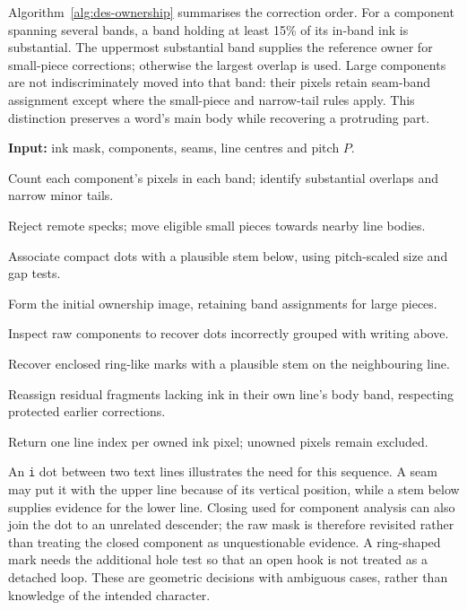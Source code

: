 Algorithm~\ref{alg:des-ownership} summarises the correction order. For a component spanning several bands, a band holding at least 15\% of its in-band ink is substantial. The uppermost substantial band supplies the reference owner for small-piece corrections; otherwise the largest overlap is used. Large components are not indiscriminately moved into that band: their pixels retain seam-band assignment except where the small-piece and narrow-tail rules apply. This distinction preserves a word's main body while recovering a protruding part.
\begin{designalgorithm}
\caption{Refining seam bands into ink ownership}
\label{alg:des-ownership}
\textbf{Input:} ink mask, components, seams, line centres and pitch $P$.
\begin{designsteps}
\item Count each component's pixels in each band; identify substantial overlaps and narrow minor tails.
\item Reject remote specks; move eligible small pieces towards nearby line bodies.
\item Associate compact dots with a plausible stem below, using pitch-scaled size and gap tests.
\item Form the initial ownership image, retaining band assignments for large pieces.
\item Inspect raw components to recover dots incorrectly grouped with writing above.
\item Recover enclosed ring-like marks with a plausible stem on the neighbouring line.
\item Reassign residual fragments lacking ink in their own line's body band, respecting protected earlier corrections.
\item Return one line index per owned ink pixel; unowned pixels remain excluded.
\end{designsteps}
\end{designalgorithm}

An \texttt{i} dot between two text lines illustrates the need for this sequence. A seam may put it with the upper line because of its vertical position, while a stem below supplies evidence for the lower line. Closing used for component analysis can also join the dot to an unrelated descender; the raw mask is therefore revisited rather than treating the closed component as unquestionable evidence. A ring-shaped mark needs the additional hole test so that an open hook is not treated as a detached loop. These are geometric decisions with ambiguous cases, rather than knowledge of the intended character.

